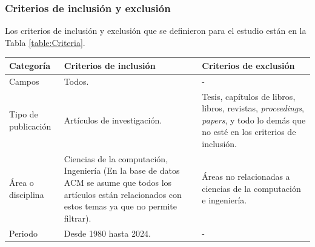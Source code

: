 \subsubsection{Criterios de inclusión y exclusión}
Los criterios de inclusión y exclusión que se definieron para el estudio están en la Tabla \ref{table:Criteria}.

\begin{table}[htbp]

	\centering
	\renewcommand{\arraystretch}{1.7}  %
	\setlength{\tabcolsep}{3pt}      %
	\vspace{10pt}                     %
	\begin{tabularx}{\textwidth}{|>{\arraybackslash}m{2.3cm}|>{\arraybackslash}X|>{\arraybackslash}X|}
		\hline
		\textbf{Categoría}  & \textbf{Criterios de inclusión}                                                                                                                                 & \textbf{Criterios de exclusión}                                                                                                                 \\
		\hline
		Campos              & Todos.                                                                                                                                                          & -                                                                                                                                               \\
		\hline
		Tipo de publicación & Artículos de investigación.                                                                                                                                     & Tesis, capítulos de libros, libros, revistas, \textit{proceedings}, \textit{papers}, y todo lo demás que no esté en los criterios de inclusión. \\
		\hline
		Área o disciplina   & Ciencias de la computación, Ingeniería (En la base de datos ACM se asume que todos los artículos están relacionados con estos temas ya que no permite filtrar). & Áreas no relacionadas a ciencias de la computación e ingeniería.                                                                                \\
		\hline
		Periodo             & Desde 1980 hasta 2024.                                                                                                                                          & -                                                                                                                                               \\

\end{tabularx}
\end{table}

